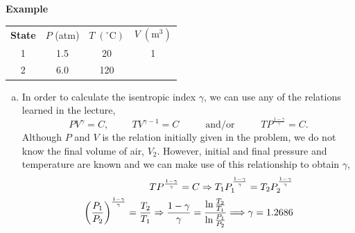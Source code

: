 \begin{MyExample}{\begin{center}{\bf Example}\end{center}}
        \begin{center}
           \begin{tabular}{c c c c}
               {\bf State}  &   $P$ (atm)  &   $T\;\left(^{\circ}\text{C}\right)$ & $V\;\left(\text{m}^{3}\right)$ \\
                    1       &     1.5      &            20                      & 1  \\
                    2       &     6.0      &            120                     &     \\              
           \end{tabular}
        \end{center}
        \begin{enumerate}[(a)]
           \item In order to calculate the isentropic index $\gamma$, we can use any of the relations learned in the lecture,
               \begin{displaymath} 
                   P V^{\gamma} = C, \hspace{1cm} T V^{\gamma-1} = C \hspace{1cm} \text{ and/or } \hspace{1cm} T P^{\frac{1-\gamma}{\gamma}} = C.
               \end{displaymath}
               Although $P$ and $V$ is the relation initially given in the problem, we do not know the final volume of air, $V_{2}$. However, initial and final pressure and temperature are known and we can make use of this relationship to obtain $\gamma$,
               \begin{eqnarray} 
                   T P^{\frac{1-\gamma}{\gamma}} = C \Rightarrow T_{1}P_{1}^{\frac{1-\gamma}{\gamma}} = T_{2}P_{2}^{\frac{1-\gamma}{\gamma}} \nonumber \\
                   \left(\displaystyle\frac{P_{1}}{P_{2}}\right)^{\frac{1-\gamma}{\gamma}} = \displaystyle\frac{T_{2}}{T_{1}} \Rightarrow \displaystyle\frac{1-\gamma}{\gamma} = \displaystyle\frac{\ln{\frac{T_{2}}{T_{1}}}}{\ln{\frac{P_{1}}{P_{2}}}} \Longrightarrow \gamma = 1.2686  \nonumber
               \end{eqnarray}
                 

\end{enumerate}
\end{MyExample}
